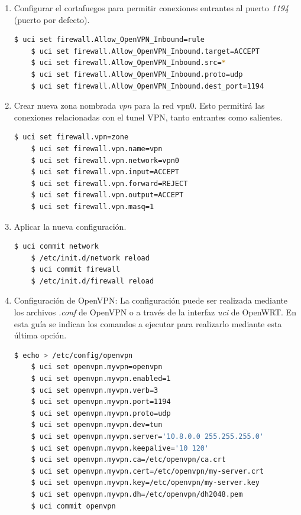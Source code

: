 \documentclass[12pt]{article}
\begin{document}
\begin{enumerate}
\begin{enumerate}
                        \item Configurar el cortafuegos para permitir conexiones entrantes al puerto \textit{1194} (puerto por defecto).

                        \begin{lstlisting}[language=bash]
    $ uci set firewall.Allow_OpenVPN_Inbound=rule
    $ uci set firewall.Allow_OpenVPN_Inbound.target=ACCEPT
    $ uci set firewall.Allow_OpenVPN_Inbound.src=*
    $ uci set firewall.Allow_OpenVPN_Inbound.proto=udp
    $ uci set firewall.Allow_OpenVPN_Inbound.dest_port=1194    
                        \end{lstlisting}

                        \item Crear nueva zona nombrada \textit{vpn} para la red vpn0. Esto permitirá las conexiones relacionadas con el tunel VPN, tanto entrantes como salientes.

                        \begin{lstlisting}[language=bash]
    $ uci set firewall.vpn=zone
    $ uci set firewall.vpn.name=vpn
    $ uci set firewall.vpn.network=vpn0
    $ uci set firewall.vpn.input=ACCEPT
    $ uci set firewall.vpn.forward=REJECT
    $ uci set firewall.vpn.output=ACCEPT
    $ uci set firewall.vpn.masq=1
                        \end{lstlisting}

                        \item Aplicar la nueva configuración.

                        \begin{lstlisting}[language=bash]
    $ uci commit network
    $ /etc/init.d/network reload
    $ uci commit firewall
    $ /etc/init.d/firewall reload  
                        \end{lstlisting}

                        \item Configuración de OpenVPN:
                        La configuración puede ser realizada mediante los archivos \textit{.conf} de OpenVPN o a través de la interfaz \textit{uci} de OpenWRT. En esta guía se indican los comandos a ejecutar para realizarlo mediante esta última opción.

                        \begin{lstlisting}[language=bash]
    $ echo > /etc/config/openvpn
    $ uci set openvpn.myvpn=openvpn
    $ uci set openvpn.myvpn.enabled=1
    $ uci set openvpn.myvpn.verb=3
    $ uci set openvpn.myvpn.port=1194
    $ uci set openvpn.myvpn.proto=udp
    $ uci set openvpn.myvpn.dev=tun
    $ uci set openvpn.myvpn.server='10.8.0.0 255.255.255.0'
    $ uci set openvpn.myvpn.keepalive='10 120'
    $ uci set openvpn.myvpn.ca=/etc/openvpn/ca.crt
    $ uci set openvpn.myvpn.cert=/etc/openvpn/my-server.crt
    $ uci set openvpn.myvpn.key=/etc/openvpn/my-server.key
    $ uci set openvpn.myvpn.dh=/etc/openvpn/dh2048.pem
    $ uci commit openvpn
                        \end{lstlisting}


\end{enumerate}
\end{enumerate}
\end{document}
